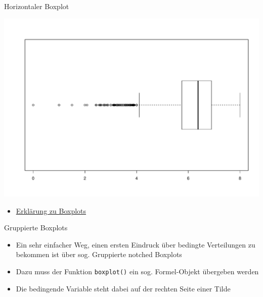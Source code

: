 \documentclass[ignorenonframetext,]{beamer}
\newenvironment{Shaded}{}{}
\newcommand{\KeywordTok}[1]{\textcolor[rgb]{0.00,0.44,0.13}{\textbf{{#1}}}}
\newcommand{\DataTypeTok}[1]{\textcolor[rgb]{0.56,0.13,0.00}{{#1}}}
\newcommand{\OtherTok}[1]{\textcolor[rgb]{0.00,0.44,0.13}{{#1}}}
\newcommand{\NormalTok}[1]{{#1}}
\providecommand{\tightlist}{%
\setlength{\itemsep}{0pt}\setlength{\parskip}{0pt}}
\begin{document}
\begin{frame}[fragile]{Horizontaler Boxplot}

\begin{Shaded}
\end{Shaded}

\includegraphics{R_intern_files/figure-beamer/unnamed-chunk-165-1.pdf}

\begin{itemize}
\tightlist
\item
  \href{http://edoc.hu-berlin.de/dissertationen/gruenwald-andreas-2005-01-17/HTML/chapter2.html}{Erklärung
  zu Boxplots}
\end{itemize}

\end{frame}

\begin{frame}[fragile]{Gruppierte Boxplots}

\begin{itemize}
\tightlist
\item
  Ein sehr einfacher Weg, einen ersten Eindruck über bedingte
  Verteilungen zu bekommen ist über sog. Gruppierte notched Boxplots
\item
  Dazu muss der Funktion \texttt{boxplot()} ein sog. Formel-Objekt
  übergeben werden
\item
  Die bedingende Variable steht dabei auf der rechten Seite einer Tilde
\end{itemize}

\end{frame}
\end{document}
